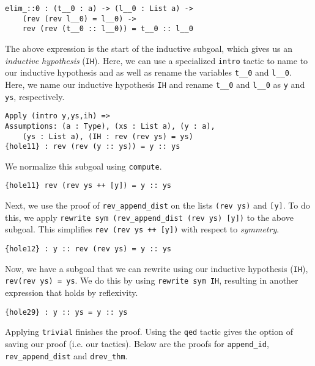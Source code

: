 \documentclass[9pt,preprint,nocopyrightspace,computermodern]{sigplanconf} %
\begin{document}
{\small
\begin{verbatim}
elim_::0 : (t__0 : a) -> (l__0 : List a) -> 
    (rev (rev l__0) = l__0) ->
    rev (rev (t__0 :: l__0)) = t__0 :: l__0
\end{verbatim}
}

The above expression is the start of the inductive subgoal, which gives us an
\textit{inductive hypothesis} ({\small\tt IH}). Here, we can use a specialized
{\small\tt intro} tactic to name to our inductive hypothesis and as well
as rename the variables {\small\tt t\_\_0} and {\tt l\_\_0}. Here, we
name our inductive hypothesis {\tt IH} and rename {\tt t\_\_0} and {\tt l\_\_0}
as {\tt y} and {\tt ys}, respectively.

{\small
\begin{verbatim}
Apply (intro y,ys,ih) =>
Assumptions: (a : Type), (xs : List a), (y : a), 
    (ys : List a), (IH : rev (rev ys) = ys)
{hole11} : rev (rev (y :: ys)) = y :: ys
\end{verbatim}
}

We normalize this subgoal using {\small\tt compute}.

{\small
\begin{verbatim}
{hole11} rev (rev ys ++ [y]) = y :: ys
\end{verbatim}
}

Next, we use the proof of {\small\tt rev\_append\_dist} on the lists
{\small\tt (rev ys)} and {\small\tt [y]}. To do this, we apply
{\small\tt rewrite sym (rev\_append\_dist (rev ys) [y])} to the above
subgoal. This simplifies {\small\tt rev (rev ys ++ [y])} with respect to
\textit{symmetry}.

{\small
\begin{verbatim}
{hole12} : y :: rev (rev ys) = y :: ys
\end{verbatim}
}

Now, we have a subgoal that we can rewrite using our inductive hypothesis
({\small\tt IH}), {\small\tt rev(rev ys) = ys}. We do this by using
{\small\tt rewrite sym IH}, resulting in another expression that holds by reflexivity.

{\small
\begin{verbatim}
{hole29} : y :: ys = y :: ys
\end{verbatim}
}

Applying {\small\tt trivial} finishes the proof. Using the {\small\tt qed}
tactic gives the option of saving our proof (i.e. our tactics). Below are the proofs
for {\small\tt append\_id}, {\small\tt rev\_append\_dist} and {\small\tt drev\_thm}.
\end{document}
